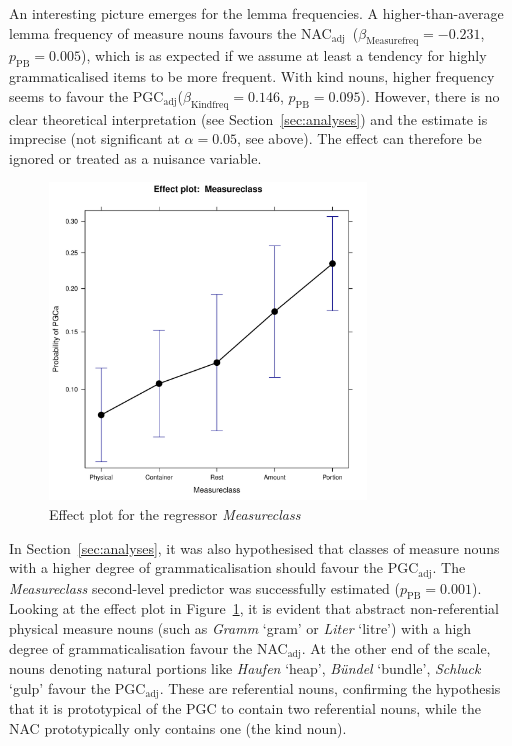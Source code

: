 \documentclass[USenglish]{article}
\newcommand{\Sub}[1]{\ensuremath{\mathrm{_{#1}}}}
\newcommand{\mpPB}{\ensuremath{p_{\text{PB}}}}
\newcommand{\NACa}{NAC\Sub{adj}}
\newcommand{\PGCa}{PGC\Sub{adj}}
\begin{document}
An interesting picture emerges for the lemma frequencies.
A higher-than-average lemma frequency of measure nouns favours the \NACa\ ($\beta_{\text{Measurefreq}}=-0.231$, $\mpPB=0.005$), which is as expected if we assume at least a tendency for highly grammaticalised items to be more frequent.
With kind nouns, higher frequency seems to favour the \PGCa ($\beta_{\text{Kindfreq}}=0.146$, $\mpPB=0.095$).
However, there is no clear theoretical interpretation (see Section~\ref{sec:analyses}) and the estimate is imprecise (not significant at $\alpha=0.05$, see above).
The effect can therefore be ignored or treated as a nuisance variable.



\begin{figure}[h!]
  \centering
  \includegraphics[width=0.75\textwidth]{../R/output/corpus_Measureclass}
  \caption{Effect plot for the regressor \textit{Measureclass}}
  \label{fig:eff:measureattraction}
\end{figure}

In Section~\ref{sec:analyses}, it was also hypothesised that classes of measure nouns with a higher degree of grammaticalisation should favour the \PGCa.
The \textit{Measureclass} second-level predictor was successfully estimated ($\mpPB=0.001$).
Looking at the effect plot in Figure~\ref{fig:eff:measureattraction}, it is evident that abstract non-referential physical measure nouns (such as \textit{Gramm} `gram' or \textit{Liter} `litre') with a high degree of grammaticalisation favour the \NACa.
At the other end of the scale, nouns denoting natural portions like \textit{Haufen} `heap', \textit{Bündel} `bundle', \textit{Schluck} `gulp' favour the \PGCa.
These are referential nouns, confirming the hypothesis that it is prototypical of the PGC to contain two referential nouns, while the NAC prototypically only contains one (the kind noun).
\end{document}
